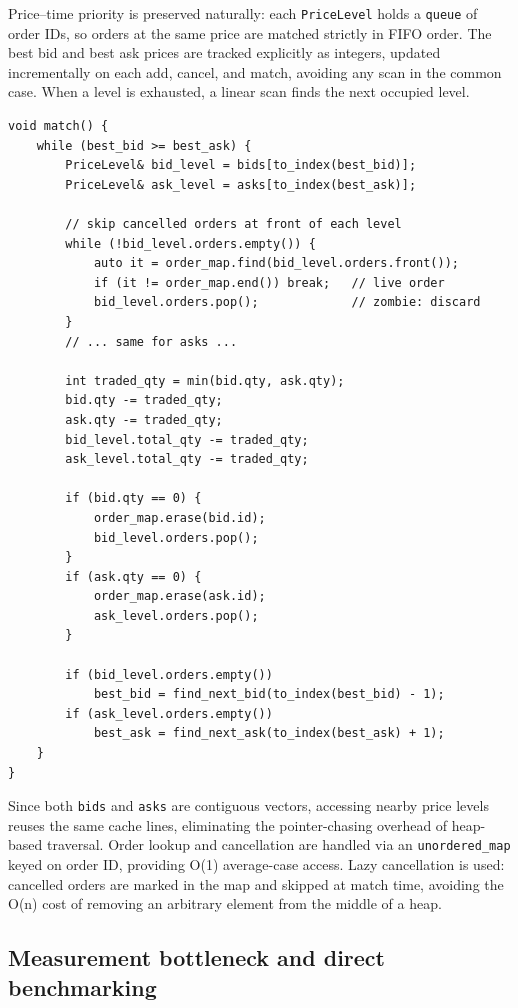 \documentclass[11pt,a4paper]{article}
\begin{document}
Price--time priority is preserved naturally: each \texttt{PriceLevel} holds
a \texttt{queue} of order IDs, so orders at the same price are matched
strictly in FIFO order. The best bid and best ask prices are tracked
explicitly as integers, updated incrementally on each add, cancel, and
match, avoiding any scan in the common case. When a level is exhausted, a
linear scan finds the next occupied level.

\begin{lstlisting}[caption={Matching logic (phase 2)}]
void match() {
    while (best_bid >= best_ask) {
        PriceLevel& bid_level = bids[to_index(best_bid)];
        PriceLevel& ask_level = asks[to_index(best_ask)];

        // skip cancelled orders at front of each level
        while (!bid_level.orders.empty()) {
            auto it = order_map.find(bid_level.orders.front());
            if (it != order_map.end()) break;   // live order
            bid_level.orders.pop();             // zombie: discard
        }
        // ... same for asks ...

        int traded_qty = min(bid.qty, ask.qty);
        bid.qty -= traded_qty;
        ask.qty -= traded_qty;
        bid_level.total_qty -= traded_qty;
        ask_level.total_qty -= traded_qty;

        if (bid.qty == 0) {
            order_map.erase(bid.id);
            bid_level.orders.pop();
        }
        if (ask.qty == 0) {
            order_map.erase(ask.id);
            ask_level.orders.pop();
        }

        if (bid_level.orders.empty())
            best_bid = find_next_bid(to_index(best_bid) - 1);
        if (ask_level.orders.empty())
            best_ask = find_next_ask(to_index(best_ask) + 1);
    }
}
\end{lstlisting}

Since both \texttt{bids} and \texttt{asks} are contiguous vectors, accessing
nearby price levels reuses the same cache lines, eliminating the
pointer-chasing overhead of heap-based traversal. Order lookup and
cancellation are handled via an \texttt{unordered\_map} keyed on order ID,
providing O(1) average-case access. Lazy cancellation is used: cancelled
orders are marked in the map and skipped at match time, avoiding the O(n)
cost of removing an arbitrary element from the middle of a heap.

\subsection{Measurement bottleneck and direct benchmarking}
\end{document}
